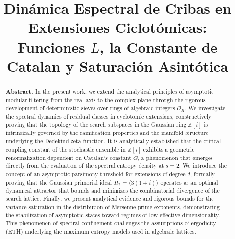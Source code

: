 \documentclass{article}
\title{Dinámica Espectral de Cribas en Extensiones Ciclotómicas: Funciones $L$, la Constante de Catalan y Saturación Asintótica}
\numberwithin{equation}{section}
\theoremstyle{plain}
\theoremstyle{definition}
\begin{document}
\begin{abstract}
\textbf{Abstract.} In the present work, we extend the analytical principles of asymptotic modular filtering from the real axis to the complex plane through the rigorous development of deterministic sieves over rings of algebraic integers $\mathcal{O}_K$. We investigate the spectral dynamics of residual classes in cyclotomic extensions, constructively proving that the topology of the search subspaces in the Gaussian ring $\mathbb{Z}[i]$ is intrinsically governed by the ramification properties and the manifold structure underlying the Dedekind zeta function. It is analytically established that the critical coupling constant of the stochastic ensemble in $\mathbb{Z}[i]$ exhibits a geometric renormalization dependent on Catalan's constant $G$, a phenomenon that emerges directly from the evaluation of the spectral entropy density at $s=2$. We introduce the concept of an asymptotic parsimony threshold for extensions of degree $d$, formally proving that the Gaussian primorial ideal $\Pi_2 = \langle 3(1+i) \rangle$ operates as an optimal dynamical attractor that bounds and minimizes the combinatorial divergence of the search lattice. Finally, we present analytical evidence and rigorous bounds for the variance saturation in the distribution of Mersenne prime exponents, demonstrating the stabilization of asymptotic states toward regimes of low effective dimensionality. This phenomenon of spectral confinement challenges the assumptions of ergodicity (ETH) underlying the maximum entropy models used in algebraic lattices.

\vspace{1em}


\end{abstract}
\end{document}
